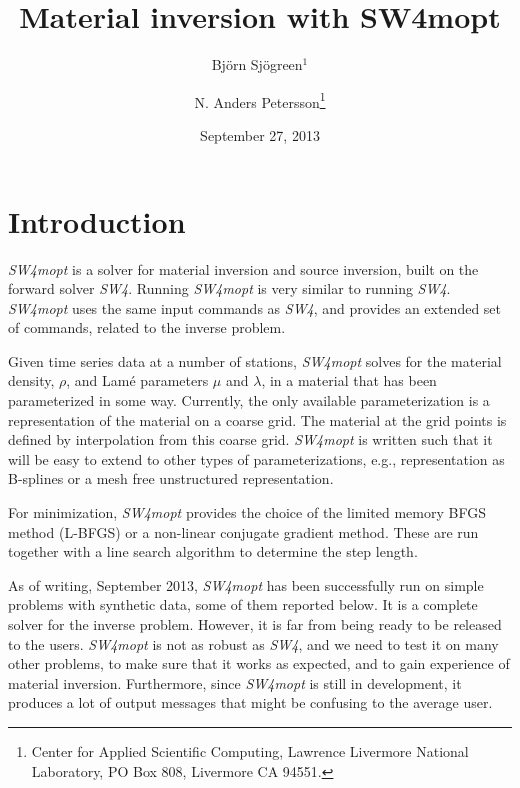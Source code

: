 \documentclass[12pt]{report}
\begin{document}
\title{\Huge\bf Material inversion with SW4mopt} 

\author{Bj\"orn Sj\"ogreen$^1$ \and N. Anders Petersson\thanks{Center for Applied Scientific
     Computing, Lawrence Livermore National Laboratory, PO Box 808, Livermore CA 94551.}}
\date{September 27, 2013} 
\maketitle



\chapter{ Introduction }\label{sec:matopt}

\emph{SW4mopt} is a solver for material inversion and source inversion, built on
the forward solver \emph{SW4}. Running \emph{SW4mopt} is very similar to running
\emph{SW4}. \emph{SW4mopt} uses the same input commands as \emph{SW4}, and 
provides an extended set of commands, related to the inverse problem.
\par
Given time series data at a number of stations, \emph{SW4mopt} solves for the material
density, $\rho$, and Lam\'e parameters $\mu$ and $\lambda$, in
a material that has been parameterized in some way. Currently, the only available parameterization
is a representation of the material on a coarse grid. The material at the grid points is 
defined by interpolation from this coarse grid. \emph{SW4mopt} is written such that it will
be easy to extend to other types of parameterizations, e.g., representation as B-splines or 
a mesh free unstructured representation.
\par
For minimization, \emph{SW4mopt} provides the choice of the limited memory BFGS method (L-BFGS)
or a non-linear conjugate gradient method. These are run together with a line search algorithm
to determine the step length. 
\par
As of writing, September 2013, \emph{SW4mopt} has been successfully run on simple problems 
with synthetic data, some of them reported below. It is a complete solver for the inverse problem. 
However, it is far from being ready to be released to the users. \emph{SW4mopt} is not as 
robust as \emph{SW4}, and we need to test it on many other problems, to make sure that it works 
as expected, and to gain experience of material inversion. Furthermore, since \emph{SW4mopt} is 
still in development, it produces a lot of output messages that might be confusing to the average user.
\end{document}
